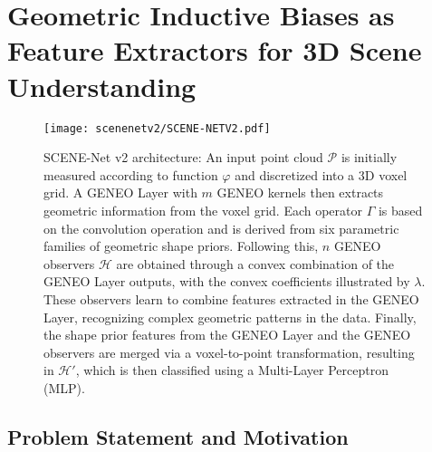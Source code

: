 

\section{Geometric Inductive Biases as Feature Extractors for 3D Scene Understanding}\label{scenenetv2}

\begin{figure}[ht]
      \centering
      \texttt{[image: scenenetv2/SCENE-NETV2.pdf]}
      \caption[SCENE-Net v2 Architecture]{SCENE-Net v2 architecture: An input point cloud $\mathcal{P}$ is initially measured according to function $\varphi$ and discretized into a 3D voxel grid. A GENEO Layer with $m$ GENEO kernels then extracts geometric information from the voxel grid. Each operator $\Gamma$ is based on the convolution operation and is derived from six parametric families of geometric shape priors. Following this, $n$ GENEO observers $\mathcal{H}$ are obtained through a convex combination of the GENEO Layer outputs, with the convex coefficients illustrated by $\lambda$. These observers learn to combine features extracted in the GENEO Layer, recognizing complex geometric patterns in the data. Finally, the shape prior features from the GENEO Layer and the GENEO observers are merged via a voxel-to-point transformation, resulting in $\mathcal{H}'$, which is then classified using a Multi-Layer Perceptron (MLP).
      }
      \label{fig:gnet_overview}
\end{figure}

\subsection{Problem Statement and Motivation}

